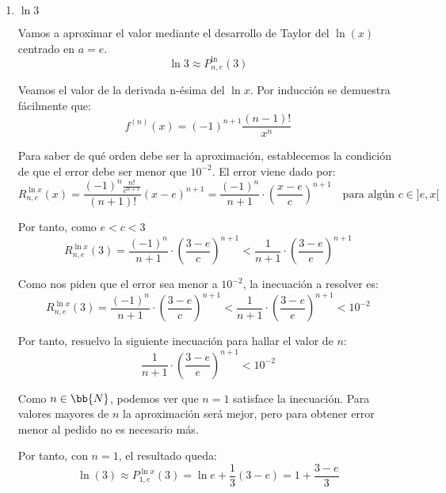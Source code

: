 \begin{ejercicio}
\begin{enumerate}
        
        \item $\ln 3$

        Vamos a aproximar el valor mediante el desarrollo de Taylor del $\ln(x)$ centrado en $a=e$.
        $$\ln 3\approx P_{n, e}^{\ln}\left(3\right)$$

        Veamos el valor de la derivada n-ésima del $\ln x$. Por inducción se demuestra fácilmente que: $$f^{(n)}(x) = (-1)^{n+1} \frac{(n-1)!}{x^n}$$

        Para saber de qué orden debe ser la aproximación, establecemos la condición de que el error debe ser menor que $10^{-2}$. El error viene dado por:
        \begin{equation*}
            R_{n,e}^{\ln x}\left(x\right) = \frac{(-1)^n \frac{n!}{c^{n+1}}}{(n+1)!}(x-e)^{n+1} = \frac{(-1)^n}{n+1}\cdot \left(\frac{x-e}{c} \right)^{n+1}
            \quad \text{para algún } c\in ]e, x[
        \end{equation*}

        Por tanto, como $e<c<3$
        \begin{equation*}
            R_{n,e}^{\ln x}\left(3\right)
            = \frac{(-1)^n}{n+1}\cdot \left(\frac{3-e}{c} \right)^{n+1}
            < \frac{1}{n+1}\cdot \left(\frac{3-e}{e} \right)^{n+1}
        \end{equation*}

        Como nos piden que el error sea menor a $10^{-2}$, la inecuación a resolver es:
        \begin{equation*}
            R_{n,e}^{\ln x}\left(3\right)
            = \frac{(-1)^n}{n+1}\cdot \left(\frac{3-e}{c} \right)^{n+1}
            < \frac{1}{n+1}\cdot \left(\frac{3-e}{e} \right)^{n+1}
            < 10^{-2}
        \end{equation*}
        
        Por tanto, resuelvo la siguiente inecuación para hallar el valor de $n$:
        \begin{equation*}
            \frac{1}{n+1}\cdot \left(\frac{3-e}{e} \right)^{n+1}
            < 10^{-2}
        \end{equation*}

        Como $n\in \bb{N}$, podemos ver que $n=1$ satisface la inecuación. Para valores mayores de $n$ la aproximación será mejor, pero para obtener error menor al pedido no es necesario más.
        
        Por tanto, con $n=1$, el resultado queda:
        $$\ln (3) \approx P_{1, e}^{\ln x}\left(3\right)
        = \ln e + \frac{1}{3}(3-e) = 1+\frac{3-e}{3}$$


\end{enumerate}
\end{ejercicio}
